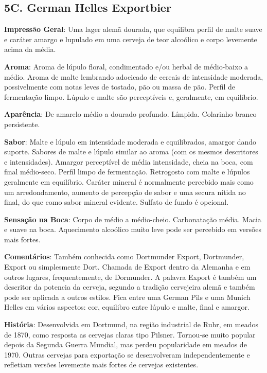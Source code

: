\subsection*{5C. German Helles Exportbier}
\textbf{Impressão Geral}: Uma lager alemã dourada, que equilibra perfil de malte suave e caráter amargo e lupulado em uma cerveja de teor alcoólico e corpo levemente acima da média.

\textbf{Aroma}: Aroma de lúpulo floral, condimentado e/ou herbal de médio-baixo a médio. Aroma de malte lembrando adocicado de cereais de intensidade moderada, possivelmente com notas leves de tostado, pão ou massa de pão. Perfil de fermentação limpo. Lúpulo e malte são perceptíveis e, geralmente, em equilíbrio.

\textbf{Aparência}: De amarelo médio a dourado profundo. Límpida. Colarinho branco persistente.

\textbf{Sabor}: Malte e lúpulo em intensidade moderada e equilibrados, amargor dando suporte. Sabores de malte e lúpulo similar ao aroma (com os mesmos descritores e intensidades). Amargor perceptível de média intensidade, cheia na boca, com final médio-seco. Perfil limpo de fermentação. Retrogosto com malte e lúpulos geralmente em equilíbrio. Caráter mineral é normalmente percebido mais como um arredondamento, aumento de percepção de sabor e uma secura nítida no final, do que como sabor mineral evidente. Sulfato de fundo é opcional.

\textbf{Sensação na Boca}: Corpo de médio a médio-cheio. Carbonatação média. Macia e suave na boca. Aquecimento alcoólico muito leve pode ser percebido em versões mais fortes.

\textbf{Comentários}: Também conhecida como Dortmunder Export, Dortmunder, Export ou simplesmente Dort. Chamada de Export dentro da Alemanha e em outros lugares, frequentemente, de Dormunder. A palavra Export é também um descritor da potencia da cerveja, segundo a tradição cervejeira alemã e também pode ser aplicada a outros estilos. Fica entre uma German Pils e uma Munich Helles em vários aspectos: cor, equilibro entre lúpulo e malte, final e amargor.

\textbf{História}: Desenvolvida em Dortmund, na região industrial de Ruhr, em meados de 1870, como resposta as cervejas claras tipo Pilsner. Tornou-se muito popular depois da Segunda Guerra Mundial, mas perdeu popularidade em meados de 1970. Outras cervejas para exportação se desenvolveram independentemente e refletiam versões levemente mais fortes de cervejas existentes.

